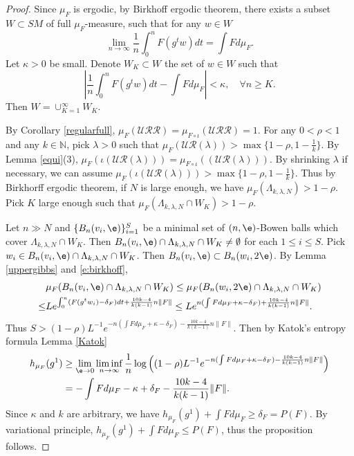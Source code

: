 \documentclass[11pt]{amsart}
\theoremstyle{definition}
\newcommand{\UR}{\mathcal{UR}}
\newcommand{\URR}{\mathcal{URR}}
\def\NN{{\mathbb N}}
\def\d{\delta}   %
\def\l{\lambda}   \def\L{\Lambda}
\begin{document}
\begin{proof}
Since $\mu_F$ is ergodic, by Birkhoff ergodic theorem, there exists a subset $W\subset SM$ of full $\mu_F$-measure, such that for any $w\in W$
\[\lim_{n\to \infty}\frac{1}{n}\int_0^nF(g^tw)dt=\int Fd\mu_F.\]
Let $\kappa>0$ be small. Denote $W_K\subset W$ the set of $w\in W$ such that
\begin{equation}\label{e:birkhoff}
\left|\frac{1}{n}\int_0^nF(g^tw)dt-\int Fd\mu_F\right|<\kappa, \quad \forall n\ge K.
\end{equation}
Then $W=\cup_{K=1}^\infty W_K$.

By Corollary \ref{regularfull}, $\mu_F(\URR)=\mu_{F\circ \iota}(\URR)=1$.
For any $0<\rho<1$ and any $k\in \NN$, pick $\l>0$ such that $\mu_F(\UR(\l))>\max\{1-\rho, 1-\frac{1}{k}\}$. By Lemma \ref{equi}(3), $\mu_F(\iota(\UR(\l)))=\mu_{F\circ\iota}((\UR(\l)))$. By shrinking $\l$ if necessary, we can assume $\mu_F(\iota(\UR(\l)))>\max\{1-\rho, 1-\frac{1}{k}\}$. Thus by Birkhorff ergodic theorem, if $N$ is large enough, we have $\mu_F(\L_{k,\l,N})>1-\rho$. Pick $K$ large enough  such that $\mu_F(\L_{k,\l,N}\cap W_K)>1-\rho$.  

Let $n\gg N$ and $\{B_n(v_i,\e)\}_{i=1}^S$ be a minimal set of $(n,\e)$-Bowen balls which cover $\L_{k,\l,N}\cap W_K$. Then $B_n(v_i,\e)\cap \L_{k,\l,N}\cap W_K\neq \emptyset$ for each $1\le i\le S$. Pick $w_i\in B_n(v_i,\e)\cap \L_{k,\l,N}\cap W_K$. Then $B_n(v_i,\e)\subset B_n(w_i,2\e)$. By Lemma \ref{uppergibbs} and \eqref{e:birkhoff}, 
\begin{equation*}
\begin{aligned}
&\mu_F(B_n(v_i,\e)\cap \L_{k,\l,N}\cap W_K)\le \mu_F(B_n(w_i,2\e)\cap \L_{k,\l,N}\cap W_K)\\
\le &Le^{\int_0^n(F(g^tw_i)- \d_F)dt+\frac{10k-4}{k(k-1)}n\|F\|}\le Le^{n(\int Fd\mu_F+\kappa-\d_F)+\frac{10k-4}{k(k-1)}n\|F\|}.
\end{aligned}
\end{equation*}
Thus $S>(1-\rho)L^{-1}e^{-n(\int Fd\mu_F+\kappa-\d_F)-\frac{10k-4}{k(k-1)}n\|F\|}$.
Then by Katok's entropy formula Lemma \ref{Katok}
\begin{equation*}
\begin{aligned}
h_{\mu_{F}}(g^1)&\ge \lim_{\e\to 0}\liminf_{n\to \infty}\frac{1}{n}\log \left((1-\rho)L^{-1}e^{-n(\int Fd\mu_F+\kappa-\d_F)-\frac{10k-4}{k(k-1)}n\|F\|}\right)\\
&=-\int Fd\mu_{F}-\kappa+\d_F-\frac{10k-4}{k(k-1)}\|F\|.
\end{aligned}
\end{equation*}
Since $\kappa$ and $k$ are arbitrary, we have $h_{\mu_{F}}(g^1)+\int Fd\mu_{F}\ge \d_F=P(F)$.
By variational principle, $h_{\mu_{F}}(g^1)+\int Fd\mu_{F}\le P(F)$, thus the proposition follows.
\end{proof}
\end{document}
